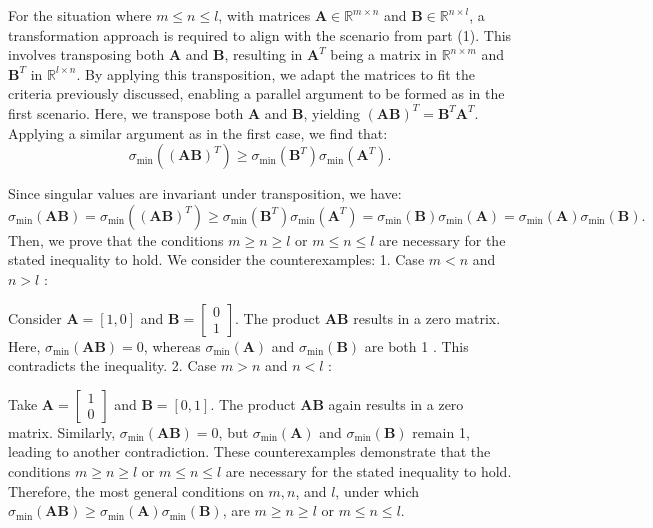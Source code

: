 \documentclass{article}
\begin{document}
For the situation where $m \leq n \leq l$, with matrices $\boldsymbol{A} \in \mathbb{R}^{m \times n}$ and $\boldsymbol{B} \in \mathbb{R}^{n \times l}$, a transformation approach is required to align with the scenario from part (1). This involves transposing both $\boldsymbol{A}$ and $\boldsymbol{B}$, resulting in $\boldsymbol{A}^T$ being a matrix in $\mathbb{R}^{n \times m}$ and $\boldsymbol{B}^T$ in $\mathbb{R}^{l \times n}$. By applying this transposition, we adapt the matrices to fit the criteria previously discussed, enabling a parallel argument to be formed as in the first scenario.
Here, we transpose both $\boldsymbol{A}$ and $\boldsymbol{B}$, yielding $(\boldsymbol{A B})^T=\boldsymbol{B}^T \boldsymbol{A}^T$.
Applying a similar argument as in the first case, we find that:
$$
\sigma_{\min }\left((\boldsymbol{A} \boldsymbol{B})^T\right) \geq \sigma_{\min }\left(\boldsymbol{B}^T\right) \sigma_{\min }\left(\boldsymbol{A}^T\right) .
$$

Since singular values are invariant under transposition, we have:
$$
\sigma_{\min }(\boldsymbol{A} \boldsymbol{B})=\sigma_{\min }\left((\boldsymbol{A} \boldsymbol{B})^T\right) \geq \sigma_{\min }\left(\boldsymbol{B}^T\right) \sigma_{\min }\left(\boldsymbol{A}^T\right)=\sigma_{\min }(\boldsymbol{B}) \sigma_{\min }(\boldsymbol{A})=\sigma_{\min }(\boldsymbol{A}) \sigma_{\min }(\boldsymbol{B}) .
$$Then, we prove that the conditions $m \geq n \geq l$ or $m \leq n \leq l$ are necessary for the stated inequality to hold. We consider the counterexamples:
1. Case $m<n$ and $n>l$ :

Consider $\boldsymbol{A}=[1,0]$ and $\boldsymbol{B}=\left[\begin{array}{l}0 \\ 1\end{array}\right]$. The product $\boldsymbol{A} \boldsymbol{B}$ results in a zero matrix.
Here, $\sigma_{\min }(\boldsymbol{A} \boldsymbol{B})=0$, whereas $\sigma_{\min }(\boldsymbol{A})$ and $\sigma_{\min }(\boldsymbol{B})$ are both 1 . This contradicts the inequality.
2. Case $m>n$ and $n<l$ :

Take $\boldsymbol{A}=\left[\begin{array}{l}1 \\ 0\end{array}\right]$ and $\boldsymbol{B}=[0,1]$. The product $\boldsymbol{A} \boldsymbol{B}$ again results in a zero matrix.
Similarly, $\sigma_{\min }(\boldsymbol{A} \boldsymbol{B})=0$, but $\sigma_{\min }(\boldsymbol{A})$ and $\sigma_{\min }(\boldsymbol{B})$ remain 1, leading to another contradiction.
These counterexamples demonstrate that the conditions $m \geq n \geq l$ or $m \leq n \leq l$ are necessary for the stated inequality to hold.
Therefore, the most general conditions on $m, n$, and $l$, under which $\sigma_{\min }(\boldsymbol{A} \boldsymbol{B}) \geq \sigma_{\min }(\boldsymbol{A}) \sigma_{\min }(\boldsymbol{B})$, are $m \geq n \geq l$ or $m \leq n \leq l$.
\end{document}
